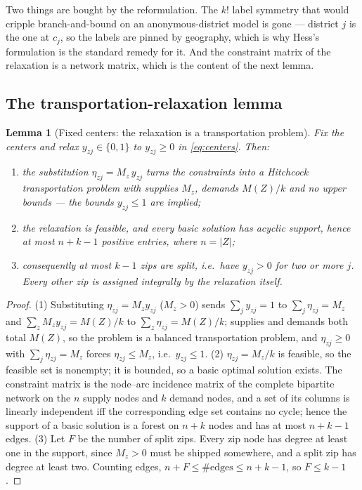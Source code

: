 \documentclass[11pt]{article}
\newtheorem{lem}[prop]{Lemma}
\theoremstyle{definition}
\begin{document}
Two things are bought by the reformulation. The $k!$ label symmetry that would cripple
branch-and-bound on an anonymous-district model is gone --- district $j$ is the one at
$c_j$, so the labels are pinned by geography, which is why Hess's formulation is the
standard remedy for it. And the constraint matrix of the relaxation is a network matrix,
which is the content of the next lemma.

\subsection{The transportation-relaxation lemma}

\begin{lem}[Fixed centers: the relaxation is a transportation problem]\label{lem:transport}
Fix the centers and relax $y_{zj}\in\{0,1\}$ to $y_{zj}\ge0$ in \eqref{eq:centers}. Then:
\begin{enumerate}
\item the substitution $\eta_{zj}=M_z\,y_{zj}$ turns the constraints into a Hitchcock
transportation problem with supplies $M_z$, demands $M(Z)/k$ and no upper bounds --- the
bounds $y_{zj}\le1$ are implied;
\item the relaxation is feasible, and every basic solution has acyclic support, hence at
most $n+k-1$ positive entries, where $n=\lvert Z\rvert$;
\item consequently at most $k-1$ zips are \emph{split}, i.e.\ have $y_{zj}>0$ for two or
more $j$. Every other zip is assigned integrally by the relaxation itself.
\end{enumerate}
\end{lem}

\begin{proof}
(1) Substituting $\eta_{zj}=M_z y_{zj}$ ($M_z>0$) sends $\sum_j y_{zj}=1$ to
$\sum_j\eta_{zj}=M_z$ and $\sum_z M_z y_{zj}=M(Z)/k$ to $\sum_z\eta_{zj}=M(Z)/k$; supplies
and demands both total $M(Z)$, so the problem is a balanced transportation problem, and
$\eta_{zj}\ge0$ with $\sum_j \eta_{zj}=M_z$ forces $\eta_{zj}\le M_z$, i.e.\ $y_{zj}\le1$.
(2) $\eta_{zj}=M_z/k$ is feasible, so the feasible set is nonempty; it is bounded, so a
basic optimal solution exists. The constraint matrix is the node--arc incidence matrix of
the complete bipartite network on the $n$ supply nodes and $k$ demand nodes, and a set of
its columns is linearly independent iff the corresponding edge set contains no cycle;
hence the support of a basic solution is a forest on $n+k$ nodes and has at most $n+k-1$
edges.
(3) Let $F$ be the number of split zips. Every zip node has degree at least one in the
support, since $M_z>0$ must be shipped somewhere, and a split zip has degree at least two.
Counting edges, $n+F\le\#\text{edges}\le n+k-1$, so $F\le k-1$.
\end{proof}
\end{document}
